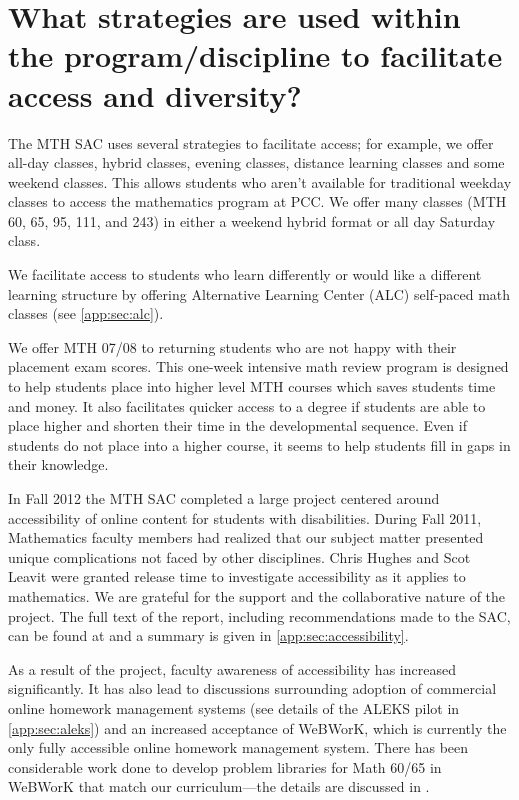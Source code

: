 \section[Strategies to facilitate access and diversity]{What strategies are used within the program/discipline to facilitate access and diversity?}\label{needs:sec:access}
The MTH SAC uses several strategies to facilitate access; for
example, we offer all-day classes, hybrid classes, evening classes, distance learning classes
and some weekend classes. This allows students who aren't available for traditional
weekday classes to access the mathematics program at PCC. We offer many classes (MTH 60, 65, 95, 111, and 243) in either a weekend hybrid format or all day Saturday class.


We facilitate access to students who learn differently or would like a
different learning structure by offering  Alternative Learning Center (ALC)
self-paced math classes (see \vref{app:sec:alc}).

We offer MTH 07/08  to returning students who are not happy with their
placement exam scores. This one-week intensive math review program is designed
to help students place into higher level MTH courses which saves students time
and money. It also facilitates quicker access to a degree if students are able
to place higher and shorten their time in the developmental sequence.  Even if
students do not place into a higher course, it seems to help students fill in
gaps in their knowledge.

In Fall 2012 the MTH SAC completed a large project centered around accessibility of online content
for students with disabilities. During Fall 2011, Mathematics faculty members
had realized that our subject matter presented unique complications not faced by other
disciplines. Chris Hughes and Scot Leavit were granted release time to
investigate accessibility as it applies to mathematics. We are grateful for the
support and the collaborative nature of the project.\label{needs:page:disabilityservices}
The full text of the report, including recommendations made to the SAC, can be found at
\cite{accessibilityproject} and a summary is given in
\vref{app:sec:accessibility}.

As a result of the project, faculty awareness of accessibility has increased
significantly. It has also lead to discussions surrounding adoption of
commercial online homework management systems (see details of the ALEKS pilot
in \vref{app:sec:aleks}) and an increased acceptance of WeBWorK, which is currently
the only fully accessible online homework
management system. There has been considerable work done to develop problem
libraries for Math 60/65 in WeBWorK that match our curriculum---the details are
discussed in .


